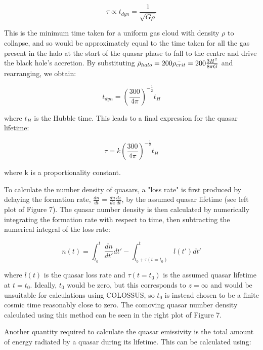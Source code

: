 \documentclass[12pt]{article}%
\begin{document}
\begin{equation}
    \tau\propto t_{dyn}=\frac{1}{\sqrt{G\rho}}
\end{equation}

\noindent This is the minimum time taken for a uniform gas cloud with density $\rho$ to collapse, and so would be approximately equal to the time taken for all the gas present in the halo at the start of the quasar phase to fall to the centre and drive the black hole’s accretion. By substituting $\Bar{\rho}_{halo}=200\Bar{\rho_{crit}}=200\frac{3H^2}{8\pi G}$ and rearranging, we obtain:

\begin{equation}
    t_{dyn}=\left(\frac{300}{4\pi}\right)^{-\frac{1}{2}}t_H
\end{equation}

\noindent where $t_H$ is the Hubble time. This leads to a final expression for the quasar lifetime:

\begin{equation}
    \tau=k\left(\frac{300}{4\pi}\right)^{-\frac{1}{2}}t_H
\end{equation}

\noindent where k is a proportionality constant.\par

To calculate the number density of quasars, a "loss rate" is first produced by delaying the formation rate, $\frac{dn}{dt}=\frac{dn}{dz}\frac{dz}{dt}$, by the assumed quasar lifetime (see left plot of Figure 7). The quasar number density is then calculated by numerically integrating the formation rate with respect to time, then subtracting the numerical integral of the loss rate:

\begin{equation}
    n(t)=\int_{t_0}^t\frac{dn}{dt'}dt'-\int_{t_0+\tau(t=t_0)}^tl(t')dt'
\end{equation}

\noindent where $l(t)$ is the quasar loss rate and $\tau(t=t_0)$ is the assumed quasar lifetime at $t=t_0$. Ideally, $t_0$ would be zero, but this corresponds to $z=\infty$ and would be unsuitable for calculations using COLOSSUS, so $t_0$ is instead chosen to be a finite cosmic time reasonably close to zero. The comoving quasar number density calculated using this method can be seen in the right plot of Figure 7.\par

Another quantity required to calculate the quasar emissivity is the total amount of energy radiated by a quasar during its lifetime. This can be calculated using:
\end{document}
